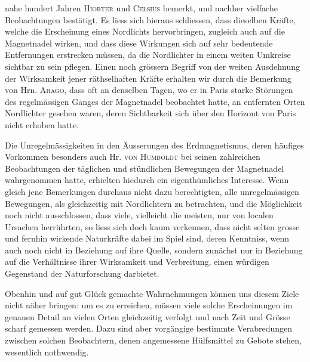 nahe hundert Jahren \textsc{Hiorter} und \textsc{Celsius} bemerkt, und nachher vielfache Beobachtungen bestätigt. Es liess sich hieraus schliessen, dass dieselben Kräfte, welche die Erscheinung eines Nordlichts hervorbringen, zugleich auch auf die Magnetnadel wirken, und dass diese Wirkungen sich auf sehr bedeutende Entfernungen erstrecken müssen, da die Nordlichter in einem weiten Umkreise sichtbar zu sein pflegen. Einen noch grössern Begriff von der weiten Ausdehnung der Wirksamkeit jener räthselhaften Kräfte erhalten wir durch die Bemerkung von Hrn. \textsc{Arago}, dass oft an denselben Tagen, wo er in Paris starke Störungen des regelmässigen Ganges der Magnetnadel beobachtet hatte, an entfernten Orten Nordlichter gesehen waren, deren Sichtbarkeit sich über den Horizont von Paris nicht erhoben hatte.

Die Unregelmässigkeiten in den Äusserungen des Erdmagnetismus, deren häufiges Vorkommen besonders auch Hr. \textsc{von Humboldt} bei seinen zahlreichen Beobachtungen der täglichen und stündlichen Bewegungen der Magnetnadel wahrgenommen hatte, erhielten hiedurch ein eigenthümliches Interesse. Wenn gleich jene Bemerkungen durchaus nicht dazu berechtigten, alle unregelmässigen Bewegungen, als gleichzeitig mit Nordlichtern zu betrachten, und die Möglichkeit noch nicht ausschlossen, dass viele, vielleicht die meisten, nur von localen Ursachen herrührten, so liess sich doch kaum verkennen, dass nicht selten grosse und fernhin wirkende Naturkräfte dabei im Spiel sind, deren Kenntniss, wenn auch noch nicht in Beziehung auf ihre Quelle, sondern zunächst nur in Beziehung auf die Verhältnisse ihrer Wirksamkeit und Verbreitung, einen würdigen Gegenstand der Naturforschung darbietet.

Obenhin und auf gut Glück gemachte Wahrnehmungen können uns diesem Ziele nicht näher bringen: um es zu erreichen, müssen viele solche Erscheinungen im genauen Detail an vielen Orten gleichzeitig verfolgt und nach Zeit und Grösse scharf gemessen werden. Dazu sind aber vorgängige bestimmte Verabredungen zwischen solchen Beobachtern, denen angemessene Hülfsmittel zu Gebote stehen, wesentlich nothwendig.


